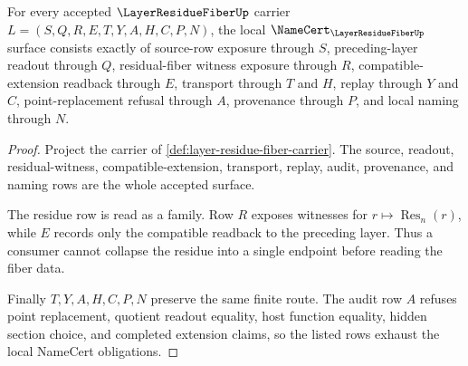 \begin{theorem}
\label{thm:layer-residue-fiber-namecert-obligations}
For every accepted $\LayerResidueFiberUp$ carrier $L=(S,Q,R,E,T,Y,A,H,C,P,N)$, the local $\NameCert_{\LayerResidueFiberUp}$ surface consists exactly of source-row exposure through $S$, preceding-layer readout through $Q$, residual-fiber witness exposure through $R$, compatible-extension readback through $E$, transport through $T$ and $H$, replay through $Y$ and $C$, point-replacement refusal through $A$, provenance through $P$, and local naming through $N$.
\end{theorem}
\begin{proof}
Project the carrier of \autoref{def:layer-residue-fiber-carrier}. The source, readout, residual-witness, compatible-extension, transport, replay, audit, provenance, and naming rows are the whole accepted surface.

The residue row is read as a family. Row $R$ exposes witnesses for $r\mapsto\operatorname{Res}_n(r)$, while $E$ records only the compatible readback to the preceding layer. Thus a consumer cannot collapse the residue into a single endpoint before reading the fiber data.

Finally $T,Y,A,H,C,P,N$ preserve the same finite route. The audit row $A$ refuses point replacement, quotient readout equality, host function equality, hidden section choice, and completed extension claims, so the listed rows exhaust the local NameCert obligations.
\end{proof}

